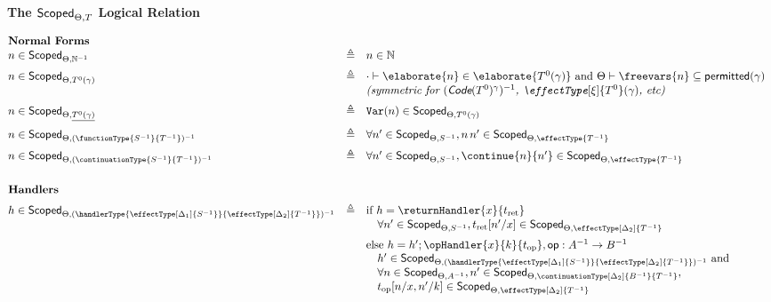 \begin{figure}
\begin{rec-desc}
  {\large\textbf{The $\textsf{Scoped}_{{\Theta}, {T}}$ Logical Relation}}
  \vspace{5mm}

  $
  \begin{array}{@{}lllr}
    \textbf{Normal Forms} \\\vspace{2mm}
    n \in \scoped{\mathbb{N}^{-1}} & \triangleq & n \in \mathbb{N} \\ 
    n \in \scoped{{T}^{0}(\gamma)} & \triangleq & \cdot \vdash \elaborate{n} \in \elaborate{T^{0} (\gamma)} \text{ and } \Theta \vdash \freevars{n} \subseteq \textsf{permitted}(\gamma) \\\vspace{2mm}
    && \textit{(symmetric for $(\textsf{Code}(T^0)^{\gamma})^{-1}$, $\effectType[\xi]{T^{0}} (\gamma)$, etc) }\\\vspace{2mm}
    n \in \scoped{\underline{{T}^{0}(\gamma)}} & \triangleq & \texttt{Var}({n}) \in \scoped{{T^{0}} (\gamma)} \\ \vspace{2mm}
    n \in \scoped{(\functionType{{S}^{-1}}{{T}^{-1}})^{-1}} & \triangleq & \forall n' \in \scoped{{S}^{-1}}, n \, n' \in \scoped{\effectType{T^{-1}}} \\ \vspace{2mm}
    n \in \scoped{(\continuationType{{S}^{-1}}{{T}^{-1}})^{-1}} & \triangleq & \forall n' \in \scoped{{S}^{-1}}, \continue{n}{n'} \in \scoped{\effectType{T^{-1}}} \\\\ \vspace{2mm}
    \textbf{Handlers} \\
    h \in \scoped{(\handlerType{\effectType[\Delta_1]{{S}^{-1}}}{\effectType[\Delta_2]{{T}^{-1}}})^{-1}} & \triangleq & \text{if } h = \returnHandler{x}{t_{\text{ret}}}\\ \vspace{2mm}
    && \quad \forall n' \in \scoped{{S}^{-1}}, t_{\text{ret}}[n'/x] \in \scoped{\effectType[\Delta_2]{T^{-1}}} \\
    && \text{else } h = h'; \opHandler{x}{k}{t_{\text{op}}}, \textsf{op}: A^{-1} \to B^{-1} \\
    && \quad h' \in \scoped{(\handlerType{\effectType[\Delta_1]{{S}^{-1}}}{\effectType[\Delta_2]{{T}^{-1}}})^{-1}} \text{ and}\\ 
    && \quad \forall n \in \scoped{{A}^{-1}}, n' \in \scoped{\continuationType[\Delta_2]{{B}^{-1}}{T^{-1}}}, \\ && \quad t_{\text{op}}[n/x, n'/k] \in \scoped{\effectType[\Delta_2]{T^{-1}}}\\\\
  \end{array}
$


\end{rec-desc}
\end{figure}
